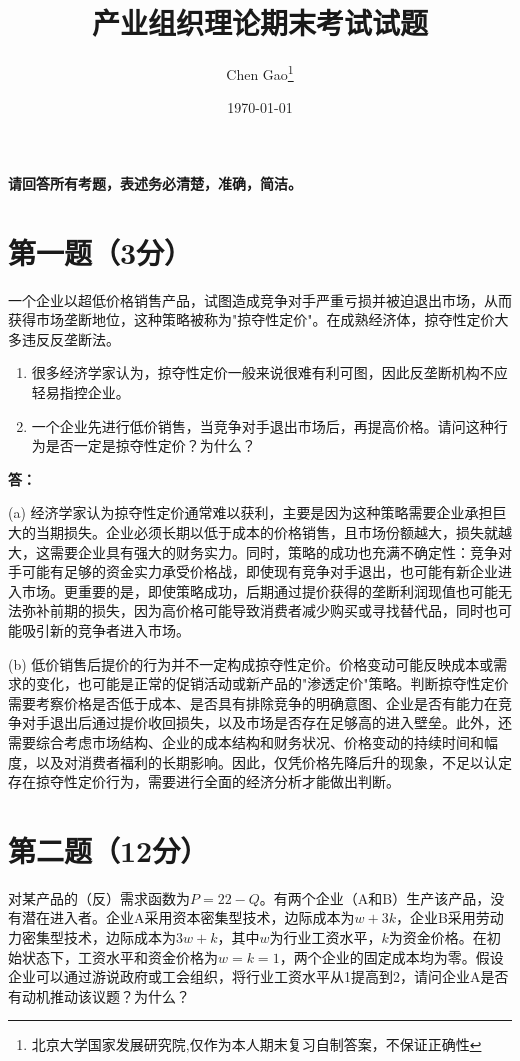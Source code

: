 \documentclass[12pt]{article}
\begin{document}
\title{产业组织理论期末考试试题}
\author{Chen Gao\thanks{北京大学国家发展研究院,仅作为本人期末复习自制答案，不保证正确性}}
\date{\today}
\maketitle

\medskip
\noindent\textbf{请回答所有考题，表述务必清楚，准确，简洁。}

\section*{第一题（3分）}
一个企业以超低价格销售产品，试图造成竞争对手严重亏损并被迫退出市场，从而获得市场垄断地位，这种策略被称为"掠夺性定价"。在成熟经济体，掠夺性定价大多违反反垄断法。

\begin{enumerate}
\item 很多经济学家认为，掠夺性定价一般来说很难有利可图，因此反垄断机构不应轻易指控企业。
\item 一个企业先进行低价销售，当竞争对手退出市场后，再提高价格。请问这种行为是否一定是掠夺性定价？为什么？
\end{enumerate}

\noindent\textbf{答：}

(a) 经济学家认为掠夺性定价通常难以获利，主要是因为这种策略需要企业承担巨大的当期损失。企业必须长期以低于成本的价格销售，且市场份额越大，损失就越大，这需要企业具有强大的财务实力。同时，策略的成功也充满不确定性：竞争对手可能有足够的资金实力承受价格战，即使现有竞争对手退出，也可能有新企业进入市场。更重要的是，即使策略成功，后期通过提价获得的垄断利润现值也可能无法弥补前期的损失，因为高价格可能导致消费者减少购买或寻找替代品，同时也可能吸引新的竞争者进入市场。

(b) 低价销售后提价的行为并不一定构成掠夺性定价。价格变动可能反映成本或需求的变化，也可能是正常的促销活动或新产品的"渗透定价"策略。判断掠夺性定价需要考察价格是否低于成本、是否具有排除竞争的明确意图、企业是否有能力在竞争对手退出后通过提价收回损失，以及市场是否存在足够高的进入壁垒。此外，还需要综合考虑市场结构、企业的成本结构和财务状况、价格变动的持续时间和幅度，以及对消费者福利的长期影响。因此，仅凭价格先降后升的现象，不足以认定存在掠夺性定价行为，需要进行全面的经济分析才能做出判断。

\section*{第二题（12分）}
对某产品的（反）需求函数为$P=22-Q$。有两个企业（A和B）生产该产品，没有潜在进入者。企业A采用资本密集型技术，边际成本为$w+3k$，企业B采用劳动力密集型技术，边际成本为$3w+k$，其中$w$为行业工资水平，$k$为资金价格。在初始状态下，工资水平和资金价格为$w=k=1$，两个企业的固定成本均为零。假设企业可以通过游说政府或工会组织，将行业工资水平从1提高到2，请问企业A是否有动机推动该议题？为什么？
\end{document}
